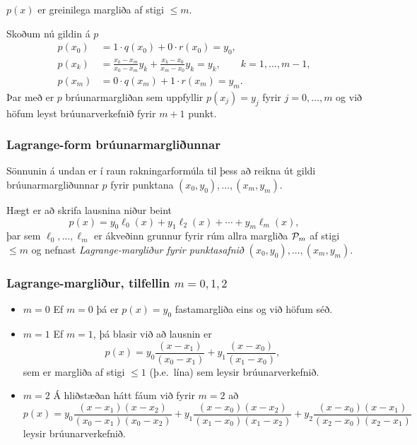 \documentclass[icelandic,a4paper,12pt]{article}
\begin{document}
$p(x)$ er greinilega margliða af stigi $\leq m$.

Skoðum nú gildin á $p$
\begin{align*}
  p(x_0) &= 1 \cdot q(x_0) + 0\cdot r(x_0) = y_0, \\
  p(x_k) &= \frac{x_k-x_m}{x_0-x_m}y_k 
  + \frac{x_k-x_0}{x_m-x_0}y_k = y_k,\qquad k = 1, \ldots, m-1,\\
  p(x_m) &= 0 \cdot q(x_m) + 1 \cdot r(x_m) = y_m.
\end{align*}\pause
Þar með er $p$ brúunarmargliðan sem uppfyllir $p(x_j)=y_j$ fyrir 
$j=0,\dots,m$ og við höfum leyst brúunarverkefnið fyrir $m+1$ punkt.


\subsubsection{Lagrange-form brúunarmargliðunnar} 

Sönnunin á undan er í raun rakningarformúla til þess að reikna
út gildi brúunarmargliðunnar $p$ fyrir punktana
$(x_0,y_0),\dots,(x_m,y_m)$. 

\pause
\smallskip
Hægt er að skrifa lausnina niður beint 
$$
p(x)=y_0\ell_0(x)+y_1\ell_2(x)+\cdots+y_m\ell_m(x),
$$  
þar sem $\ell_0,\dots,\ell_m$ er ákveðinn grunnur fyrir rúm allra
margliða ${\cal P}_m$ af stigi $\leq m$ og nefnast {\it
  Lagrange-margliður  fyrir punktasafnið} $(x_0,y_0),\dots,(x_m,y_m)$.


\subsubsection{Lagrange-margliður, tilfellin $m=0,1,2$} 
\begin{itemize}
\item $m=0$
Ef $m = 0$ þá er 
$p(x) = y_0$ 
fastamargliða eins og við höfum séð. 

\pause
\item $m=1$
Ef $m = 1$, þá blasir við að lausnin er
\begin{equation*}
  p(x) = y_0 \frac{(x-x_1)}{(x_0-x_1)}
  + y_1 \frac{(x-x_0)}{(x_1-x_0)},
\end{equation*}
sem er margliða af stigi $\leq 1$ (þ.e.~lína) sem leysir brúunarverkefnið.

\pause
\item $m=2$
Á hliðstæðan hátt fáum við fyrir $m = 2$ að
\begin{equation*}
  p(x) = y_0 \frac{(x-x_1)(x-x_2)}{(x_0-x_1)(x_0-x_2)}
  + y_1 \frac{(x-x_0)(x-x_2)}{(x_1-x_0)(x_1-x_2)}
  + y_2 \frac{(x-x_0)(x-x_1)}{(x_2-x_0)(x_2-x_1)}
\end{equation*}
leysir brúunarverkefnið.

\end{itemize}
\end{document}
